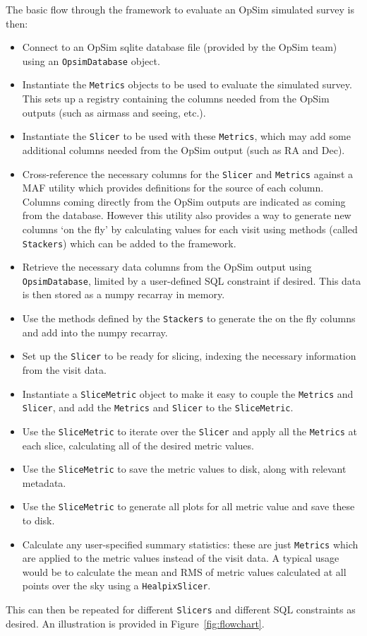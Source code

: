 \documentclass[]{spie}  %
\begin{document}
The basic flow through the framework to evaluate an OpSim simulated survey is then:
\begin{itemize}
\item{Connect to an OpSim sqlite database file (provided by the OpSim
    team) using an {\tt OpsimDatabase}
object.}
\item{Instantiate the {\tt Metrics} objects to be used to evaluate the
simulated survey. This sets up a registry containing the columns
needed from the OpSim outputs (such as airmass and seeing, etc.).}
\item{Instantiate the {\tt Slicer} to be used with these {\tt Metrics}, which may
add some additional columns needed from the OpSim output (such as RA
and Dec).}
\item{Cross-reference the necessary columns for the {\tt Slicer} and
  {\tt Metrics}
against a MAF utility which provides definitions for the source of
each column. Columns coming directly from the OpSim outputs are
indicated as coming from the database. However this utility also
provides a way to generate new columns `on the fly' by calculating
values for each visit using methods (called {\tt Stackers}) which can be
added to the framework.}
\item{Retrieve the necessary data columns from the OpSim output using
{\tt OpsimDatabase}, limited by a user-defined SQL constraint if
desired. This data is then stored as a numpy recarray in memory.}
\item{Use the methods defined by the {\tt Stackers} to generate the
on the fly columns and add into the numpy recarray.}
\item{Set up the {\tt Slicer} to be ready for slicing, indexing the
necessary information from the visit data.}
\item{Instantiate a {\tt SliceMetric} object to make it easy to couple the
{\tt Metrics} and {\tt Slicer}, and add the {\tt Metrics} and {\tt Slicer} to the
{\tt SliceMetric}.}
\item{Use the {\tt SliceMetric} to iterate over the {\tt Slicer} and apply all the
{\tt Metrics} at each slice, calculating all of the desired metric values.}
\item{Use the {\tt SliceMetric} to save the metric values to disk, along
with relevant metadata.}
\item{Use the {\tt SliceMetric} to generate all plots for all metric value
and save these to disk.}
\item{Calculate any user-specified summary statistics: these are just
    {\tt Metrics} which are applied to the metric values instead of the
    visit data. A typical usage would be to calculate the mean and RMS
    of metric values calculated at all points over the sky using a
    {\tt HealpixSlicer}.}
\end{itemize}
This can then be repeated for different {\tt Slicers} and different SQL
constraints as desired. An illustration is provided in
Figure~\ref{fig:flowchart}. 
\end{document}

